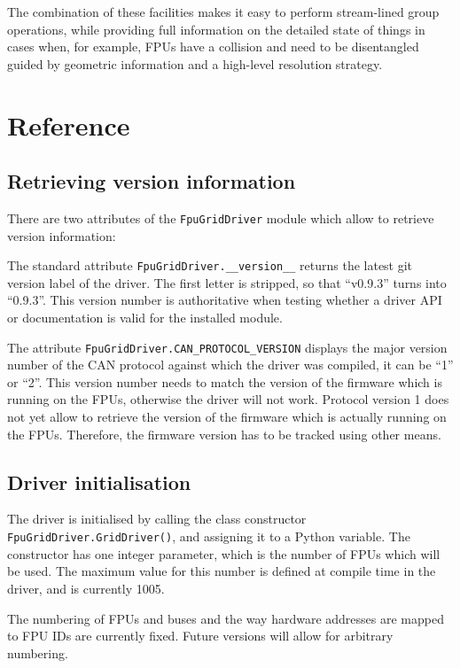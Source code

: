 \documentclass[11pt,a4paper]{report}
\begin{document}
The combination of these facilities makes it easy to perform
stream-lined group operations, while providing full information on the
detailed state of things in cases when, for example, FPUs have a
collision and need to be disentangled guided by geometric information
and a high-level resolution strategy.



\section{Reference}

\subsection{Retrieving version information}
There are two attributes of the \texttt{FpuGridDriver} module
which allow to retrieve version information:

The standard attribute \texttt{FpuGridDriver.\_\_version\_\_} returns
the latest git version label of the driver. The first letter is stripped, so
that ``v0.9.3'' turns into ``0.9.3''. This version number is
authoritative when testing whether a driver API or documentation is
valid for the installed module.

The attribute \texttt{FpuGridDriver.CAN\_PROTOCOL\_VERSION} displays
the major version number of the CAN protocol against which the driver
was compiled, it can be ``1'' or ``2''. This version number needs to
match the version of the firmware which is running on the FPUs,
otherwise the driver will not work. Protocol version 1 does not yet
allow to retrieve the version of the firmware which is actually
running on the FPUs. Therefore, the firmware version has to be tracked
using other means.


\subsection{Driver initialisation}
The driver is initialised by calling the class constructor
\texttt{FpuGridDriver.GridDriver()}, and assigning it to a Python
variable. The constructor has one integer parameter, which is the
number of FPUs which will be used. The maximum value for this number
is defined at compile time in the driver, and is currently 1005.

The numbering of FPUs and buses and the way hardware addresses are
mapped to FPU IDs are currently fixed. Future versions will allow for
arbitrary numbering.
\end{document}
